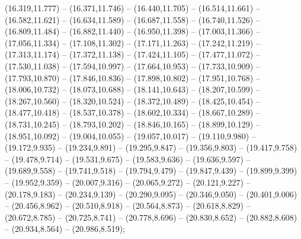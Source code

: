 (16.319,11.777) -- (16.371,11.746) -- (16.440,11.705) -- (16.514,11.661) -- (16.582,11.621) -- (16.634,11.589) -- (16.687,11.558) -- (16.740,11.526) -- (16.809,11.484) -- (16.882,11.440) -- (16.950,11.398) -- (17.003,11.366) -- (17.056,11.334) -- (17.108,11.302) -- (17.171,11.263) -- (17.242,11.219) -- (17.313,11.174) -- (17.372,11.138) -- (17.424,11.105) -- (17.477,11.072) -- (17.530,11.038) -- (17.594,10.997) -- (17.664,10.953) -- (17.733,10.909) -- (17.793,10.870) -- (17.846,10.836) -- (17.898,10.802) -- (17.951,10.768) -- (18.006,10.732) -- (18.073,10.688) -- (18.141,10.643) -- (18.207,10.599) -- (18.267,10.560) -- (18.320,10.524) -- (18.372,10.489) -- (18.425,10.454) -- (18.477,10.418) -- (18.537,10.378) -- (18.602,10.334) -- (18.667,10.289) -- (18.731,10.245) -- (18.793,10.202) -- (18.846,10.165) -- (18.899,10.129) -- (18.951,10.092) -- (19.004,10.055) -- (19.057,10.017) -- (19.110,9.980) -- (19.172,9.935) -- (19.234,9.891) -- (19.295,9.847) -- (19.356,9.803) -- (19.417,9.758) -- (19.478,9.714) -- (19.531,9.675) -- (19.583,9.636) -- (19.636,9.597) -- (19.689,9.558) -- (19.741,9.518) -- (19.794,9.479) -- (19.847,9.439) -- (19.899,9.399) -- (19.952,9.359) -- (20.007,9.316) -- (20.065,9.272) -- (20.121,9.227) -- (20.178,9.183) -- (20.234,9.139) -- (20.290,9.095) -- (20.346,9.050) -- (20.401,9.006) -- (20.456,8.962) -- (20.510,8.918) -- (20.564,8.873) -- (20.618,8.829) -- (20.672,8.785) -- (20.725,8.741) -- (20.778,8.696) -- (20.830,8.652) -- (20.882,8.608) -- (20.934,8.564) -- (20.986,8.519);